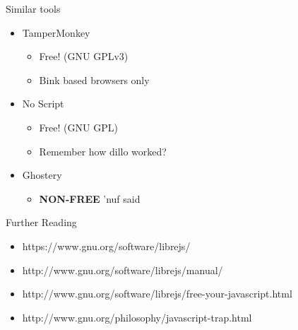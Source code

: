 \documentclass[11pt]{beamer}
\begin{document}
\begin{frame}{Similar tools}
\begin{itemize}
\item TamperMonkey\pause
\begin{itemize}
\item Free! (GNU GPLv3)
\item Bink based browsers only\pause
\end{itemize}
\item No Script\pause
\begin{itemize}
\item Free! (GNU GPL)
\item Remember how dillo worked?\pause
\end{itemize}
\item Ghostery\pause
\begin{itemize}
\item \textbf{NON-FREE} 'nuf said
\end{itemize}
\end{itemize}
\end{frame}

\begin{frame}{Further Reading}
\begin{itemize}
\item https://www.gnu.org/software/librejs/
\item http://www.gnu.org/software/librejs/manual/
\item http://www.gnu.org/software/librejs/free-your-javascript.html
\item http://www.gnu.org/philosophy/javascript-trap.html
\end{itemize}
\end{frame}
\end{document}
